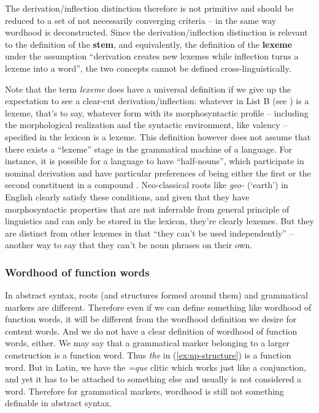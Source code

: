 \documentclass[a4paper, oneside, scheme=plain, 12pt]{article}
\newcommand*{\concept}[1]{\textbf{#1}}
\newcommand*{\term}[1]{\emph{#1}}
\newcommand{\form}[1]{\emph{#1}}
\newcommand{\translate}[1]{`#1'}
\begin{document}
The derivation/inflection distinction therefore is not primitive 
and should be reduced to a set of not necessarily converging criteria
-- in the same way wordhood is deconstructed.
Since the derivation/inflection distinction is relevant to the definition of the \concept{stem},
and equivalently, the definition of the \concept{lexeme} under the assumption ``derivation creates new lexemes while inflection turns a lexeme into a word'',
the two concepts cannot be defined cross-linguistically.

Note that the term \term{lexeme} does have a universal definition
if we give up the expectation to see a clear-cut derivation/inflection:
whatever in List B (see ) is a lexeme,
that's to say, whatever form with its morphosyntactic profile -- including the morphological realization and the syntactic environment, like valency -- specified in the lexicon is a lexeme.
This definition however does not assume that there exists a ``lexeme'' stage in the grammatical machine of a language.
For instance, it is possible for a language to have ``half-nouns'',
which participate in nominal derivation and have particular preferences of being either the first or the second constituent in a compound
\citep{di2005decomposing,scher2014unifying}.
Neo-classical roots like \form{geo-} (\translate{earth}) in English clearly satisfy these conditions,
and given that they have morphosyntactic properties that are not inferrable from general principle of linguistics and can only be stored in the lexicon,
they're clearly lexemes.
But they are distinct from other lexemes in that ``they can't be used independently'' -- another way to say that they can't be noun phrases on their own.

\subsubsection{Wordhood of function words}\label{sec:no-function-word-in-syntax}

In abstract syntax, roots (and structures formed around them) and grammatical markers are different.
Therefore even if we can define something like wordhood of function words,
it will be different from the wordhood definition we desire for content words.
And we do not have a clear definition of wordhood of function words, either.
We may say that a grammatical marker belonging to a larger construction is a function word.
Thus \form{the} in (\ref{ex:np-structure}) is a function word.
But in Latin, we have the \form{=que} clitic which works just like a conjunction,
and yet it has to be attached to something else and usually is not considered a word.
Therefore for grammatical markers, wordhood is still not something definable in abstract syntax.
\end{document}
